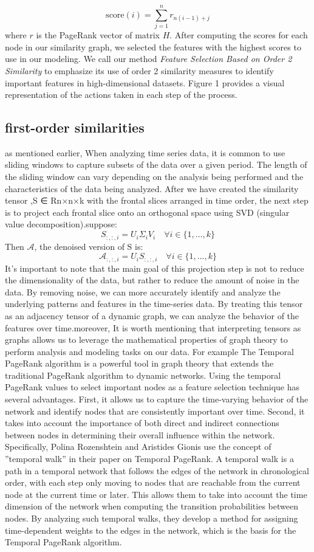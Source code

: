 \documentclass[twoside,11pt]{article}
\begin{document}
\[
  \text{score}(i) = \sum_{j=1}^{n} r_{n(i-1) + j}
\]
where \( r \) is the PageRank vector of matrix \( H \). After computing the scores for each node in our similarity graph, we selected the features with the highest scores to use in our modeling. We call our method \textit{Feature Selection Based on Order 2 Similarity} to emphasize its use of order 2 similarity measures to identify important features in high-dimensional datasets. Figure 1 provides a visual representation of the actions taken in each step of the process.
\subsection{first-order similarities}
as mentioned earlier, When analyzing time series data, it is common to use sliding windows
to capture subsets of the data over a given period. The length of the sliding window can vary depending on the analysis being performed and the characteristics of the data being
analyzed.
After we have created the similarity tensor ,S ∈ Rn×n×k with the frontal slices arranged
in time order, the next step is to project each frontal slice onto an orthogonal space using
SVD (singular value decomposition).suppose:
\[
  S_{:,:,i} = U_i \Sigma_i V_i \quad \forall i \in \{1, \ldots, k\}
\]
Then \(\mathcal{A}\), the denoised version of S is:
\[
  \mathcal{A}_{:,:,i} = U_i S_{:,:,i} \quad \forall i \in \{1, \ldots, k\}
\]
It’s important to note that the main goal of this projection step is not to reduce the dimensionality of the data, but rather to reduce the amount of noise in the data. By removing
noise, we can more accurately identify and analyze the underlying patterns and features in
the time-series data.
By treating this tensor as an adjacency tensor of a dynamic graph, we can analyze the
behavior of the features over time.moreover, It is worth mentioning that interpreting tensors
as graphs allows us to leverage the mathematical properties of graph theory to perform
analysis and modeling tasks on our data. For example The Temporal PageRank algorithm
is a powerful tool in graph theory that extends the traditional PageRank algorithm to
dynamic networks.
Using the temporal PageRank values to select important nodes as a feature selection
technique has several advantages. First, it allows us to capture the time-varying behavior
of the network and identify nodes that are consistently important over time. Second, it
takes into account the importance of both direct and indirect connections between nodes
in determining their overall influence within the network.
Specifically, Polina Rozenshtein and Aristides Gionis use the concept of ”temporal walk”
in their paper on Temporal PageRank. A temporal walk is a path in a temporal network
that follows the edges of the network in chronological order, with each step only moving to nodes that are reachable from the current node at the current time or later. This allows
them to take into account the time dimension of the network when computing the transition
probabilities between nodes. By analyzing such temporal walks, they develop a method for
assigning time-dependent weights to the edges in the network, which is the basis for the
Temporal PageRank algorithm.
\end{document}
